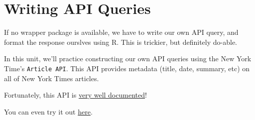 \documentclass[]{book}
\newenvironment{Shaded}{\begin{snugshade}}{\end{snugshade}}
\newcommand{\KeywordTok}[1]{\textcolor[rgb]{0.13,0.29,0.53}{\textbf{#1}}}
\newcommand{\DataTypeTok}[1]{\textcolor[rgb]{0.13,0.29,0.53}{#1}}
\newcommand{\DecValTok}[1]{\textcolor[rgb]{0.00,0.00,0.81}{#1}}
\newcommand{\StringTok}[1]{\textcolor[rgb]{0.31,0.60,0.02}{#1}}
\newcommand{\CommentTok}[1]{\textcolor[rgb]{0.56,0.35,0.01}{\textit{#1}}}
\newcommand{\OtherTok}[1]{\textcolor[rgb]{0.56,0.35,0.01}{#1}}
\newcommand{\OperatorTok}[1]{\textcolor[rgb]{0.81,0.36,0.00}{\textbf{#1}}}
\newcommand{\NormalTok}[1]{#1}
\begin{document}
\begin{Shaded}
\end{Shaded}

\hypertarget{writing-api-queries}{\section{Writing API
Queries}\label{writing-api-queries}}

If no wrapper package is available, we have to write our own API query,
and format the response ourslves using R. This is trickier, but
definitely do-able.

In this unit, we'll practice constructing our own API queries using the
New York Time's \texttt{Article\ API}. This API provides metadata
(title, date, summary, etc) on all of New York Times articles.

Fortunately, this API is
\href{https://developer.nytimes.com/docs/articlesearch-product/1/overview}{very
well documented}!

You can even try it out
\href{http://developer.nytimes.com/io-docs}{here}.
\end{document}
